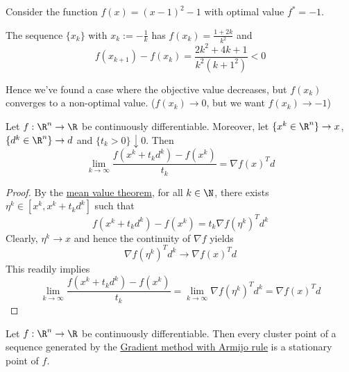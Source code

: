 Consider the function $f(x)=(x-1)^2-1$ with optimal value $f^*=-1$.

The sequence $\{x_k\}$ with $x_k:=-\frac1k$ has
$f(x_k)=\frac{1+2k}{k^2}$ and
$$
	f(x_{k+1})-f(x_k)=\frac{2k^2+4k+1}{k^2(k+1^2)}<0
$$

Hence we've found a case where the objective value decreases, but
$f(x_k)$ converges to a non-optimal value. ($f(x_k)\to0$, but we want
$f(x_k)\to-1$)

\label{f8e1f12}

Let $f:\R^n\to\R$ be continuously differentiable. Moreover, let
$\{x^k\in\R^n\}\to x$, $\{d^k\in\R^n\}\to d$ and
$\{t_k>0\}\downarrow0$. Then
$$
	\lim_{k\to\infty}\frac{f(x^k+t_kd^k)-f(x^k)}{t_k}=\nabla f(x)^Td
$$

\begin{proof}
	By the \href{d37aa2b}{mean value theorem}, for all $k\in\N$, there
	exists $\eta^k\in[x^k,x^k+t_kd^k]$ such that
	$$
		f(x^k+t_kd^k)-f(x^k)=t_k\nabla f(\eta^k)^Td^k
	$$
	Clearly, $\eta^k\to x$ and hence the continuity of $\nabla f$ yields
	$$
		\nabla f(\eta^k)^Td^k\to\nabla f(x)^Td
	$$
	This readily implies
	$$
		\lim_{k\to\infty}\frac{f(x^k+t_kd^k)-f(x^k)}{t_k}=
		\lim_{k\to\infty}\nabla f(\eta^k)^Td^k=
		\nabla f(x)^Td
	$$
\end{proof}

\label{bbb25cd}

Let $f:\R^n\to\R$ be continuously differentiable. Then every cluster
point of a sequence generated by the \href{ae01f6d}{Gradient method
	with Armijo rule} is a stationary point of $f$.

